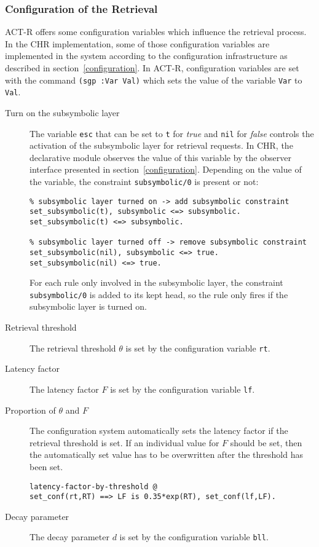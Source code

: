 \subsubsection{Configuration of the Retrieval}

ACT-R offers some configuration variables which influence the retrieval process. In the CHR implementation, some of those configuration variables are implemented in the system according to the configuration infrastructure as described in section~\ref{configuration}. In ACT-R, configuration variables are set with the command \lstinline|(sgp :Var Val)| which sets the value of the variable \lstinline|Var| to \lstinline|Val|. 

\begin{description}
 \item[Turn on the subsymbolic layer] The variable \lstinline|esc| that can be set to \lstinline|t| for \emph{true} and \lstinline|nil| for \emph{false} controls the activation of the subsymbolic layer for retrieval requests. In CHR, the declarative module observes the value of this variable by the observer interface presented in section~\ref{configuration}. Depending on the value of the variable, the constraint \lstinline|subsymbolic/0| is present or not:
 
\begin{lstlisting}
% subsymbolic layer turned on -> add subsymbolic constraint
set_subsymbolic(t), subsymbolic <=> subsymbolic.
set_subsymbolic(t) <=> subsymbolic.

% subsymbolic layer turned off -> remove subsymbolic constraint
set_subsymbolic(nil), subsymbolic <=> true.
set_subsymbolic(nil) <=> true.
\end{lstlisting}

For each rule only involved in the subsymbolic layer, the constraint \lstinline|subsymbolic/0| is added to its kept head, so the rule only fires if the subsymbolic layer is turned on.

\item[Retrieval threshold] The retrieval threshold $\theta$ is set by the configuration variable \lstinline|rt|.
\item[Latency factor] The latency factor $F$ is set by the configuration variable \lstinline|lf|.
\item[Proportion of $\theta$ and $F$] The configuration system automatically sets the latency factor if the retrieval threshold is set. If an individual value for $F$ should be set, then the automatically set value has to be overwritten after the threshold has been set.

\begin{lstlisting}
latency-factor-by-threshold @
set_conf(rt,RT) ==> LF is 0.35*exp(RT), set_conf(lf,LF). 
\end{lstlisting}

\item[Decay parameter] The decay parameter $d$ is set by the configuration variable \lstinline|bll|.

\end{description}


